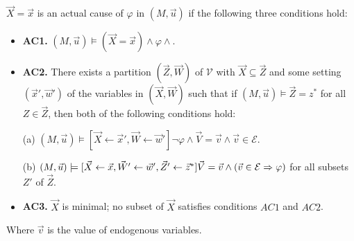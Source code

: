 \begin{definition}
    $\vec X = \vec x$ is an actual cause of $\varphi$ in $(M,\vec u)$ if the following three conditions hold:
    \begin{itemize}
        \item  \textbf{AC1.} $(M,\vec u)\models (\vec X = \vec x) \wedge \varphi \wedge $.
        \item  \textbf{AC2. }There exists a partition $(\vec Z, \vec W)$ of $\mathcal{V}$ with $\vec X \subseteq \vec Z$ and some setting $(\vec x',\vec w')$ of the variables in $(\vec X,\vec W)$ such that if $(M,\vec u)\models \vec Z = z^*$ for all $Z\in \vec Z$, then both of the following conditions hold:

              (a) $(M,\vec u)\models[\vec X \leftarrow \vec x', \vec W \leftarrow \vec w']\neg \varphi
                  \wedge \vec V = \vec v
                  \wedge  \vec v \in \mathcal{E}$.

              (b) $(M,\vec u)\models[\vec X\leftarrow \vec x, \vec W'
                      \leftarrow \vec w', \vec Z'\leftarrow \vec z^*]
                  \vec V = \vec v \wedge (\vec v \in \mathcal{E} \Rightarrow \varphi)$
              for all subsets $Z'$ of $\vec Z$.

        \item  \textbf{AC3.} $\vec X$ is minimal; no subset of $\vec X$ satisfies conditions $AC1$ and $AC2$.
    \end{itemize}
    Where $\vec v$ is the value of endogenous variables.
\end{definition}
